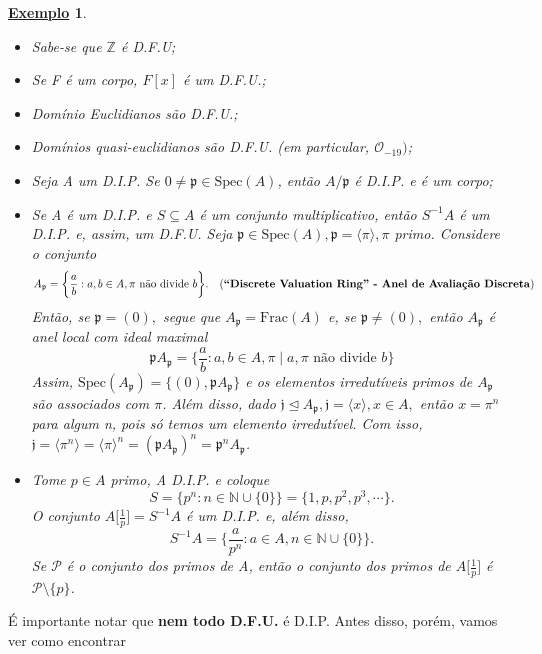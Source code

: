 \documentclass{article}
\newtheorem{example}{\underline{Exemplo}}
\begin{document}
\begin{example}
 \begin{itemize}
  \item[1)] Sabe-se que \(\mathbb{Z}\) é D.F.U;
  \item[2)] Se F é um corpo, \(F[x]\) é um D.F.U.;
  \item[3)] Domínio Euclidianos são D.F.U.;
  \item[4)] Domínios quasi-euclidianos são D.F.U. (em particular, \(\mathcal{O}_{-19})\);
  \item[5)] Seja A um D.I.P. Se \(0\neq\mathfrak{p}\in \mathrm{Spec}(A)\), então \(A/\mathfrak{p}\) é D.I.P. e é um corpo;
  \item[6)] Se A é um D.I.P. e \(S\subseteq{A}\) é um conjunto multiplicativo, então \(S^{-1}A\) é um D.I.P. e, assim, um D.F.U. Seja \(\mathfrak{p}\in \mathrm{Spec}(A), \mathfrak{p} = \langle \pi  \rangle, \pi\) primo. Considere o conjunto 
  \[
    A_{\mathfrak{p}} = \biggl\{\frac{a}{b}: a, b \in A, \pi \text{ não divide } b\biggr\}.\quad \text{(\textbf{``Discrete Valuation Ring'' - Anel de Avaliação Discreta})}
  \]
  Então, se \(\mathfrak{p} = (0),\) segue que \(A_{\mathfrak{p}} = \mathrm{Frac}(A)\) e, se \(\mathfrak{p}\neq (0),\) então
 \(A_{\mathfrak{p}}\) é anel local com ideal maximal 
 \[
   \mathfrak{p}A_{\mathfrak{p}} = \biggl\{\frac{a}{b}: a,b\in A, \pi \mid a, \pi \text{ não divide } b\biggr\}
 \]
 Assim, \(\mathrm{Spec}(A_{\mathfrak{p}}) = \{(0), \mathfrak{p}A_{\mathfrak{p}}\}\) e os elementos irredutíveis primos de \(A_{\mathfrak{p}}\)
são associados com \(\pi \). Além disso, dado \(\mathfrak{j}\trianglelefteq{A_{\mathfrak{p}}}, \mathfrak{j} = \langle x \rangle, x\in A,\) então
 \(x = \pi ^{n}\) para algum n, pois só temos um elemento irredutível. Com isso, \(\mathfrak{j} = \langle \pi ^{n} \rangle = \langle \pi  \rangle^{n} = (\mathfrak{p}A_{\mathfrak{p}})^{n} = \mathfrak{p}^{n}A_{\mathfrak{p}}\).
 \item[7)] Tome \(p\in A\) primo, A D.I.P. e coloque 
  \[
    S = \{p^{n}: n\in \mathbb{N}\cup \{0\}\} = \{1, p, p^{2}, p^{3}, \cdots\}.
  \]
  O conjunto \(A \biggl[\frac{1}{p}\biggr] = S^{-1}A\) é um D.I.P. e, além disso, 
  \[
    S^{-1}A = \biggl\{\frac{a}{p^{n}}:a\in A, n\in \mathbb{N}\cup\{0\}\biggr\}.
  \]
  Se \(\mathcal{P}\) é o conjunto dos primos de A, então o conjunto dos primos de \(A \biggl[\frac{1}{p}\biggr]\) é 
 \(\mathcal{P}\setminus{\{p\}}\).
 \end{itemize}
\end{example}
  É importante notar que \textbf{nem todo D.F.U.} é D.I.P. Antes disso, porém, vamos ver como encontrar
\end{document}
